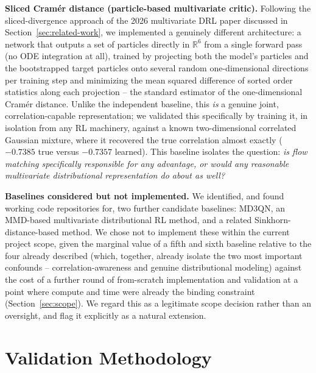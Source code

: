 \documentclass[11pt]{article}
\begin{document}
\textbf{Sliced Cram\'er distance (particle-based multivariate critic).} Following the sliced-divergence approach of the 2026 multivariate DRL paper discussed in Section~\ref{sec:related-work}, we implemented a genuinely different architecture: a network that outputs a set of particles directly in $\mathbb{R}^6$ from a single forward pass (no ODE integration at all), trained by projecting both the model's particles and the bootstrapped target particles onto several random one-dimensional directions per training step and minimizing the mean squared difference of sorted order statistics along each projection -- the standard estimator of the one-dimensional Cram\'er distance. Unlike the independent baseline, this \emph{is} a genuine joint, correlation-capable representation; we validated this specifically by training it, in isolation from any RL machinery, against a known two-dimensional correlated Gaussian mixture, where it recovered the true correlation almost exactly ($-0.7385$ true versus $-0.7357$ learned). This baseline isolates the question: \emph{is flow matching specifically responsible for any advantage, or would any reasonable multivariate distributional representation do about as well?}

\textbf{Baselines considered but not implemented.} We identified, and found working code repositories for, two further candidate baselines: MD3QN, an MMD-based multivariate distributional RL method, and a related Sinkhorn-distance-based method. We chose not to implement these within the current project scope, given the marginal value of a fifth and sixth baseline relative to the four already described (which, together, already isolate the two most important confounds -- correlation-awareness and genuine distributional modeling) against the cost of a further round of from-scratch implementation and validation at a point where compute and time were already the binding constraint (Section~\ref{sec:scope}). We regard this as a legitimate scope decision rather than an oversight, and flag it explicitly as a natural extension.

\section{Validation Methodology}
\label{sec:validation}
\end{document}
